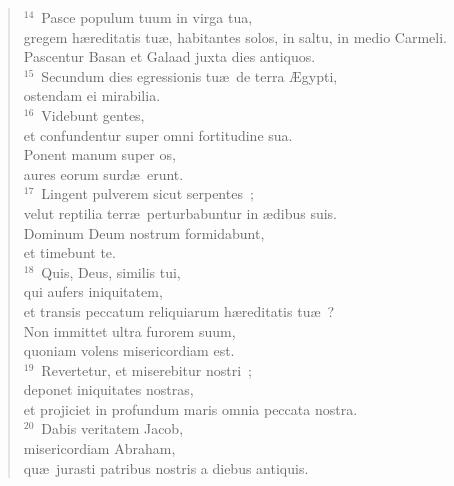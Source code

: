 \begin{flushleft}\begin{verse}${}^{14}$~Pasce populum tuum in virga tua,\\ gregem h\ae reditatis tu\ae , habitantes solos, in saltu, in medio Carmeli.\\ Pascentur Basan et Galaad juxta dies antiquos.\\
${}^{15}$~Secundum dies egressionis tu\ae\ de terra \AE gypti,\\ ostendam ei mirabilia.\\
${}^{16}$~Videbunt gentes,\\ et confundentur super omni fortitudine sua.\\ Ponent manum super os,\\ aures eorum surd\ae\ erunt.\\
${}^{17}$~Lingent pulverem sicut serpentes~;\\ velut reptilia terr\ae\ perturbabuntur in \ae dibus suis.\\ Dominum Deum nostrum formidabunt,\\ et timebunt te.\\
${}^{18}$~Quis, Deus, similis tui,\\ qui aufers iniquitatem,\\ et transis peccatum reliquiarum h\ae reditatis tu\ae~?\\ Non immittet ultra furorem suum,\\ quoniam volens misericordiam est.\\
${}^{19}$~Revertetur, et miserebitur nostri~;\\ deponet iniquitates nostras,\\ et projiciet in profundum maris omnia peccata nostra.\\
${}^{20}$~Dabis veritatem Jacob,\\ misericordiam Abraham,\\ qu\ae\ jurasti patribus nostris a diebus antiquis.\end{verse}\end{flushleft}


